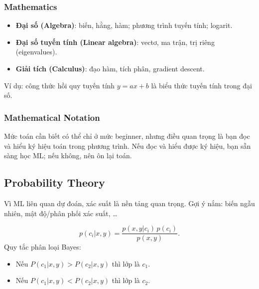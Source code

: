 \subsubsection{Mathematics}
\begin{phuongphap}[title={Các mảng toán nên biết}]
\begin{itemize}
  \item \textbf{Đại số (Algebra)}: biến, hằng, hàm; phương trình tuyến tính; logarit.
  \item \textbf{Đại số tuyến tính (Linear algebra)}: vectơ, ma trận, trị riêng (eigenvalues).
  \item \textbf{Giải tích (Calculus)}: đạo hàm, tích phân, gradient descent.
\end{itemize}
\end{phuongphap}

\begin{vidu}[title={Toán liên quan ML như thế nào?}]
Ví dụ: công thức hồi quy tuyến tính \(y=ax+b\) là biểu thức tuyến tính trong đại số.
\end{vidu}

\subsubsection{Mathematical Notation}
\begin{luuy}[title={Đọc được ký hiệu quan trọng hơn “làm tay phức tạp”}]
Mức toán cần biết có thể chỉ ở mức beginner, nhưng điều quan trọng là bạn đọc và hiểu ký hiệu toán trong phương trình.
Nếu đọc và hiểu được ký hiệu, bạn sẵn sàng học ML; nếu không, nên ôn lại toán.
\end{luuy}

\subsection{Probability Theory}

\begin{ynghia}[title={Xác suất là tiền đề quan trọng}]
Vì ML liên quan dự đoán, xác suất là nền tảng quan trọng.
Gợi ý nắm: biến ngẫu nhiên, mật độ/phân phối xác suất, \ldots
\end{ynghia}

\begin{vidu}[title={Ví dụ kiểm tra kiến thức: phân loại theo xác suất có điều kiện}]
\[
p(c_{i}|x,y)=\frac{p(x,y|c_{i})\,p(c_{i})}{p(x,y)}.
\]
Quy tắc phân loại Bayes:
\begin{itemize}
  \item Nếu \(P(c_1|x,y) > P(c_2|x,y)\) thì lớp là \(c_1\).
  \item Nếu \(P(c_1|x,y) < P(c_2|x,y)\) thì lớp là \(c_2\).
\end{itemize}
\end{vidu}

